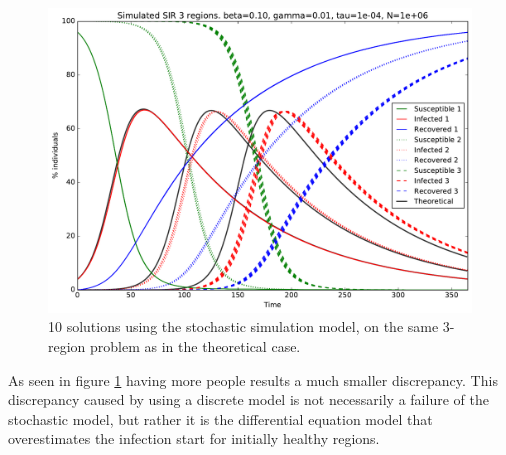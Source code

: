 \begin{figure}[H]
	\centering
	\includegraphics[width= 1.0 \linewidth]{plots/sir_three_region_sim_1000000.pdf}
	\caption{10 solutions using the stochastic simulation model, on the same 3-region problem as in the theoretical case.}
	\label{fig:sir_three_region_sim_1000000}
\end{figure}

As seen in figure \ref{fig:sir_three_region_sim_1000000} having more people results a much smaller discrepancy. This discrepancy caused by using a discrete model is not necessarily a failure of the stochastic model, but rather it is the differential equation model that overestimates the infection start for initially healthy regions.
